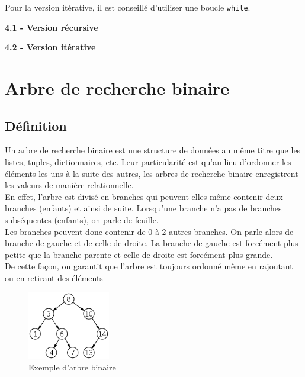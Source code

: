 \begin{Exercice}[20 minutes]
\begin{conseil}
            Pour la version itérative, il est conseillé d'utiliser une boucle \lstinline{while}.
    
        \end{conseil}
    
        \begin{solution}
            \textbf{4.1 - Version récursive}
            
        \end{solution}
        \begin{solution}
            \textbf{4.2 - Version itérative}
            
        \end{solution}
    
    \end{Exercice}
    
       
    \newpage
    \section{Arbre de recherche binaire}
    \subsection{Définition}
    
    Un arbre de recherche binaire est une structure de données au même titre que les listes, tuples, dictionnaires, etc. Leur particularité est qu'au lieu d'ordonner les éléments les uns à la suite des autres, les arbres de recherche binaire enregistrent les valeurs de manière relationnelle.\\
    
    En effet, l'arbre est divisé en branches qui peuvent elles-même contenir deux branches (enfants) et ainsi de suite. Lorsqu'une branche n'a pas de branches subséquentes (enfants), on parle de feuille.\\
    
    Les branches peuvent donc contenir de 0 à 2 autres branches. On parle alors de branche de gauche et de celle de droite. La branche de gauche est forcément plus petite que la branche parente et celle de droite est forcément plus grande.\\
    
    De cette façon, on garantit que l'arbre est toujours ordonné même en rajoutant ou en retirant des éléments\\
    
    \begin{figure}[h]
        \centering
        \includegraphics[width=0.32\textwidth]{img/binary-search-tree.png}
        \caption{Exemple d'arbre binaire}
    \end{figure}
    
